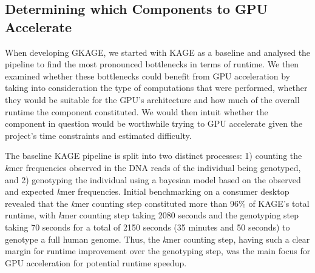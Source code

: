 \subsection{Determining which Components to GPU Accelerate}

When developing GKAGE, we started with KAGE as a baseline and analysed the pipeline to find the most pronounced bottlenecks in terms of runtime.
We then examined whether these bottlenecks could benefit from GPU acceleration by taking into consideration the type of computations that were performed, whether they would be suitable for the GPU's architecture and how much of the overall runtime the component constituted. 
We would then intuit whether the component in question would be worthwhile trying to GPU accelerate given the project's time constraints and estimated difficulty.

The baseline KAGE pipeline is split into two distinct processes: 1) counting the \textit{k}mer frequencies observed in the DNA reads of the individual being genotyped, and 2) genotyping the individual using a bayesian model based on the observed and expected \textit{k}mer frequencies.
Initial benchmarking on a consumer desktop revealed that the \textit{k}mer counting step constituted more than 96\% of KAGE's total runtime, with \textit{k}mer counting step taking 2080 seconds and the genotyping step taking 70 seconds for a total of 2150 seconds (35 minutes and 50 seconds) to genotype a full human genome.
Thus, the \textit{k}mer counting step, having such a clear margin for runtime improvement over the genotyping step, was the main focus for GPU acceleration for potential runtime speedup.
